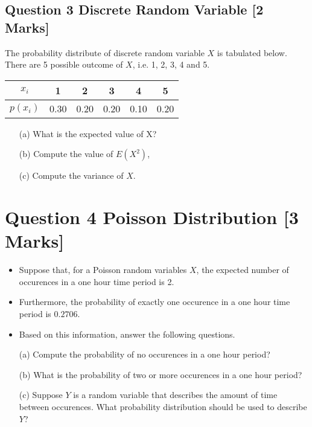 \subsection*{Question 3 Discrete Random Variable [2 Marks]}
The probability distribute of discrete random variable $X$ is tabulated below. There are 5 possible outcome of $X$, i.e. 1, 2, 3, 4 and 5.
{
\large
\begin{center}
\begin{tabular}{|c||c|c|c|c|c|}
\hline
$x_i$  & 1 & 2 & 3 & 4 & 5  \\\hline
$p(x_i)$ & 0.30 & 0.20 & 0.20 & 0.10 & 0.20 \\
\hline
\end{tabular}
\end{center}
}
\begin{itemize}
\item[(a)]  What is the expected value of X?
\item[(b)]  Compute the value of $E(X^2)$,
\item[(c)]  Compute the variance of $X$.
\end{itemize}
\bigskip
\section*{Question 4 Poisson Distribution [3 Marks]}

\begin{itemize}
\item Suppose that, for a Poisson random variables $X$, the expected number of occurences in a one hour time period is 2. 


\item Furthermore, the probability of exactly one occurence in a one
 hour time period is $0.2706$.

\item Based on this information, answer the following questions.
\end{itemize}
\begin{itemize}
\item[(a)]  Compute the probability of no occurences in a one hour period?
\item[(b)]  What is the probability of two or more occurences in a one hour period?
\item[(c)]  Suppose $Y$ is a random variable that describes the amount of time between occurences. What probability distribution should be used to describe $Y$?
\end{itemize}


